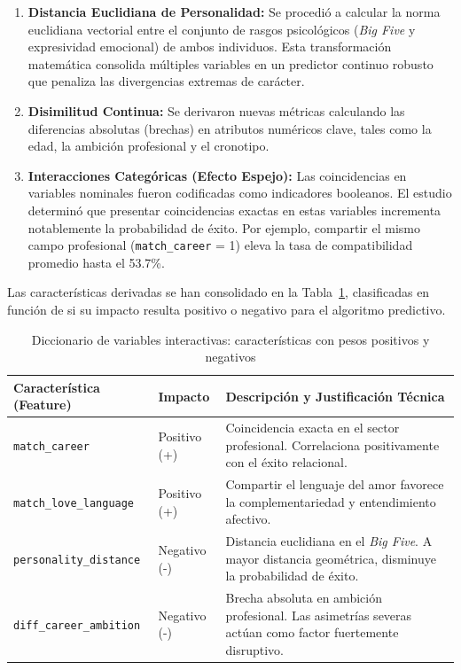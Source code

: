 \begin{enumerate}
    \item \textbf{Distancia Euclidiana de Personalidad:} Se procedió a calcular la norma euclidiana vectorial entre el conjunto de rasgos psicológicos (\textit{Big Five} y expresividad emocional) de ambos individuos. Esta transformación matemática consolida múltiples variables en un predictor continuo robusto que penaliza las divergencias extremas de carácter.
    \item \textbf{Disimilitud Continua:} Se derivaron nuevas métricas calculando las diferencias absolutas (brechas) en atributos numéricos clave, tales como la edad, la ambición profesional y el cronotipo.
    \item \textbf{Interacciones Categóricas (Efecto Espejo):} Las coincidencias en variables nominales fueron codificadas como indicadores booleanos. El estudio determinó que presentar coincidencias exactas en estas variables incrementa notablemente la probabilidad de éxito. Por ejemplo, compartir el mismo campo profesional (\texttt{match\_career} = 1) eleva la tasa de compatibilidad promedio hasta el 53.7\%.
\end{enumerate}

Las características derivadas se han consolidado en la Tabla~\ref{tab:diccionario_pesos}, clasificadas en función de si su impacto resulta positivo o negativo para el algoritmo predictivo.

\begin{table}[H]
\centering
\begin{tabular}{llp{8.5cm}}
\hline
\textbf{Característica (Feature)} & \textbf{Impacto} & \textbf{Descripción y Justificación Técnica} \\ \hline
\texttt{match\_career} & Positivo (+) & Coincidencia exacta en el sector profesional. Correlaciona positivamente con el éxito relacional. \\
\texttt{match\_love\_language} & Positivo (+) & Compartir el lenguaje del amor favorece la complementariedad y entendimiento afectivo. \\
\texttt{personality\_distance} & Negativo (-) & Distancia euclidiana en el \textit{Big Five}. A mayor distancia geométrica, disminuye la probabilidad de éxito. \\
\texttt{diff\_career\_ambition} & Negativo (-) & Brecha absoluta en ambición profesional. Las asimetrías severas actúan como factor fuertemente disruptivo. \\ \hline
\end{tabular}
\caption{Diccionario de variables interactivas: características con pesos positivos y negativos}
\label{tab:diccionario_pesos}
\end{table}

